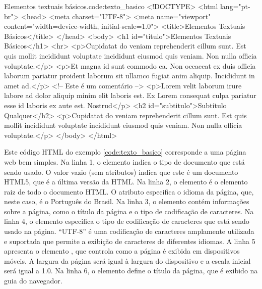 \begin{htmlcode}{Elementos textuais básicos.}{code:texto_basico}
<!DOCTYPE>
<html lang="pt-br">
<head>
    <meta charset="UTF-8">
    <meta name="viewport" content="width=device-width, initial-scale=1.0">
    <title>Elementos Textuais Básicos</title>
</head>
<body>
    <h1 id="titulo">Elementos Textuais Básicos</h1>
    <hr>
    <p>Cupidatat do veniam reprehenderit cillum sunt. Est quis mollit incididunt
    voluptate incididunt eiusmod quis veniam. Non nulla officia voluptate.</p>
    <p>Et magna id sunt commodo ea. Non occaecat ex duis officia laborum pariatur
    proident laborum sit ullamco fugiat anim aliquip. Incididunt in amet ad.</p>
    <!-- Este é um comentário -->
    <p>Lorem velit laborum irure labore ad dolor aliquip minim elit laboris est.
    Ex Lorem consequat culpa pariatur esse id laboris ex aute est. Nostrud</p>
    <h2 id="subtitulo">Subtítulo Qualquer</h2>
    <p>Cupidatat do veniam reprehenderit cillum sunt. Est quis mollit incididunt
    voluptate incididunt eiusmod quis veniam. Non nulla officia voluptate.</p>
</body>
</html>
\end{htmlcode}

Este código HTML do exemplo \ref{code:texto_basico} corresponde a uma página web bem simples. Na linha 1, o elemento  indica o tipo de documento que está sendo usado. O valor vazio (sem atributos) indica que este é um documento HTML5, que é a última versão da HTML. Na linha 2, o elemento  é o elemento raiz de todo o documento HTML. O atributo  especifica o idioma da página, que, neste caso, é o Português do Brasil. Na linha 3, o elemento  contém informações sobre a página, como o título da página e o tipo de codificação de caracteres. Na linha 4, o elemento  especifica o tipo de codificação de caracteres que está sendo usado na página. ``UTF-8'' é uma codificação de caracteres amplamente utilizada e suportada que permite a exibição de caracteres de diferentes idiomas. A linha 5 apresenta o elemento , que controla como a página é exibida em dispositivos móveis. A largura da página será igual à largura do dispositivo e a escala inicial será igual a 1.0. Na linha 6, o elemento  define o título da página, que é exibido na guia do navegador.

